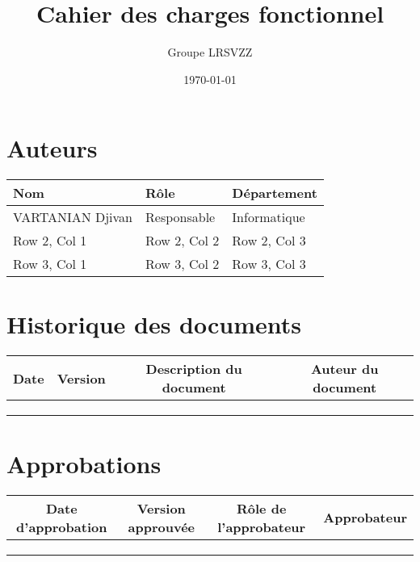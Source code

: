 \documentclass[a4paper,12pt]{report}  %
\title{Cahier des charges fonctionnel}
\author{Groupe LRSVZZ}
\date{\today}
\begin{document}
	
	\maketitle
	
	\section*{Auteurs}
	
	\renewcommand{\arraystretch}{1.5}  %
	\begin{table}[h]
		\begin{tabularx}{\textwidth}{|X|X|X|}  %
			\hline
			\textbf{Nom} & \textbf{Rôle} & \textbf{Département} \\
			\hline
			VARTANIAN Djivan & Responsable & Informatique \\
			\hline
			Row 2, Col 1 & Row 2, Col 2 & Row 2, Col 3 \\
			\hline
			Row 3, Col 1 & Row 3, Col 2 & Row 3, Col 3 \\
			\hline
		\end{tabularx}
	\end{table}
	
	\section*{Historique des documents}
	\begin{table}[h]
		\begin{tabular}{|c|c|c|c|} 
			\hline
			\textbf{Date} & \textbf{Version} & \textbf{Description du document} & \textbf{Auteur du document} \\
			\hline
			& & & \\
			\hline
			& & & \\
			\hline
			& & & \\
			\hline
		\end{tabular}
	\end{table}
	
	\section*{Approbations}
	\begin{table}[h]
		\begin{tabular}{|c|c|c|c|} 
			\hline
			\textbf{Date d'approbation} & \textbf{Version approuvée} & \textbf{Rôle de l'approbateur} & \textbf{Approbateur} \\
			\hline
			& & & \\
			\hline
			& & & \\
			\hline
			& & & \\
			\hline
		\end{tabular}
	\end{table}
	
\end{document}
